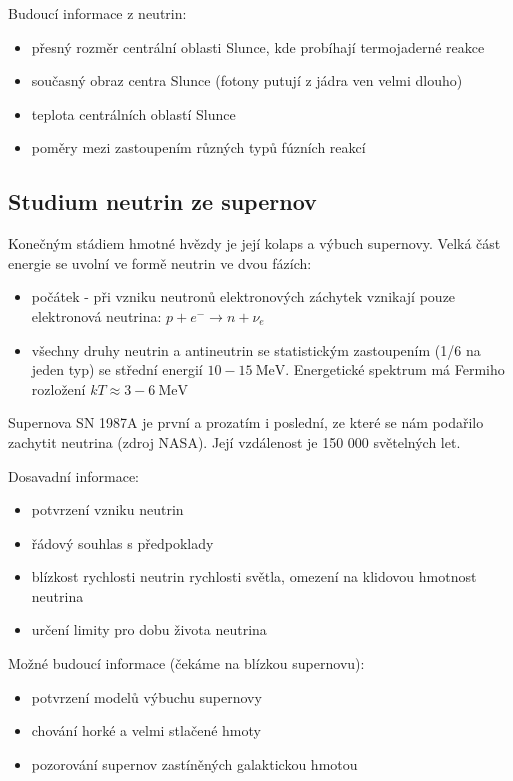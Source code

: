 \documentclass[../../main.tex]{subfiles}
\begin{document}
Budoucí informace z neutrin:
\begin{itemize}
	\item přesný rozměr centrální oblasti Slunce, kde probíhají termojaderné reakce
	\item současný obraz centra Slunce (fotony putují z jádra ven velmi dlouho)
	\item teplota centrálních oblastí Slunce
	\item poměry mezi zastoupením různých typů fúzních reakcí
\end{itemize}

\subsection{Studium neutrin ze supernov}

Konečným stádiem hmotné hvězdy je její kolaps a výbuch supernovy. Velká část energie se uvolní ve formě neutrin ve dvou fázích:
\begin{itemize}
	\item počátek - při vzniku neutronů elektronových záchytek vznikají pouze elektronová neutrina: $p + e^- \rightarrow n + \nu_e$
	\item všechny druhy neutrin a antineutrin se statistickým zastoupením (1/6 na jeden typ) se střední energií $10 - 15 ~\mathrm{MeV}$. Energetické spektrum má Fermiho rozložení $kT \approx 3-6 ~\mathrm{MeV}$
\end{itemize}

Supernova SN 1987A je první a prozatím i poslední, ze které se nám podařilo zachytit neutrina (zdroj NASA). Její vzdálenost je 150 000 světelných let.

Dosavadní informace:
\begin{itemize}
	\item potvrzení vzniku neutrin
	\item řádový souhlas s předpoklady
	\item blízkost rychlosti neutrin rychlosti světla, omezení na klidovou hmotnost neutrina
	\item určení limity pro dobu života neutrina
\end{itemize}

Možné budoucí informace (čekáme na blízkou supernovu):
\begin{itemize}
	\item potvrzení modelů výbuchu supernovy
	\item chování horké a velmi stlačené hmoty
	\item pozorování supernov zastíněných galaktickou hmotou
\end{itemize}
\end{document}
